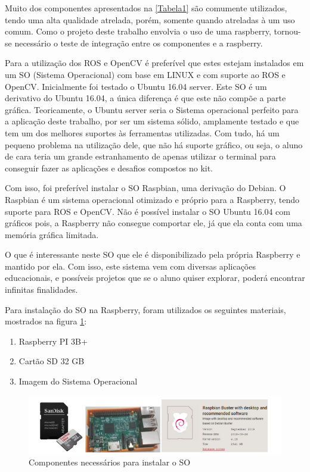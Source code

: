 Muito dos componentes apresentados na \ref{Tabela1} são comumente utilizados, tendo uma alta qualidade atrelada, porém, somente quando atreladas à um uso comum. Como o projeto deste trabalho envolvia o uso de uma raspberry, tornou-se necessário o teste de integração entre os componentes e a raspberry.

Para a utilização dos ROS e OpenCV é preferível que estes estejam instalados em um SO (Sistema Operacional) com base em LINUX e com suporte ao ROS e OpenCV. Inicialmente foi testado o Ubuntu 16.04 server. Este SO é um derivativo do Ubuntu 16.04, a única diferença é que este não compõe a parte gráfica. Teoricamente, o Ubuntu server seria o Sistema operacional perfeito para a aplicação deste trabalho, por ser um sistema sólido, amplamente testado e que tem um dos melhores suportes às ferramentas utilizadas. Com tudo, há um pequeno problema na utilização dele, que não há suporte gráfico, ou seja, o aluno de cara teria um grande estranhamento de apenas utilizar o terminal para conseguir fazer as aplicações e desafios compostos no kit. 

Com isso, foi preferível instalar o SO Raspbian, uma derivação do Debian. O Raspbian é um sistema operacional otimizado e próprio para a Raspberry, tendo suporte para ROS e OpenCV. Não é possível instalar o SO Ubuntu 16.04 com gráficos pois, a Raspberry não consegue comportar ele, já que ela conta com uma memória gráfica limitada.

O que é interessante neste SO que ele é disponibilizado pela própria Raspberry e mantido por ela. Com isso, este sistema vem com diversas aplicações educacionais, e possíveis projetos que se o aluno quiser explorar, poderá encontrar infinitas finalidades.

Para instalação do SO na Raspberry, foram utilizados os seguintes materiais, mostrados na figura \ref{fig:SO}:

\begin{enumerate}
	\item Raspberry PI 3B+
	\item Cartão SD 32 GB
	\item Imagem do Sistema Operacional

\end{enumerate}

\begin{figure}[H]
	\centering
	\includegraphics[scale=0.8, angle=0]{Figures/so.png}
	\caption{Componentes necessários para instalar o SO}
	\label{fig:SO}
\end{figure}


